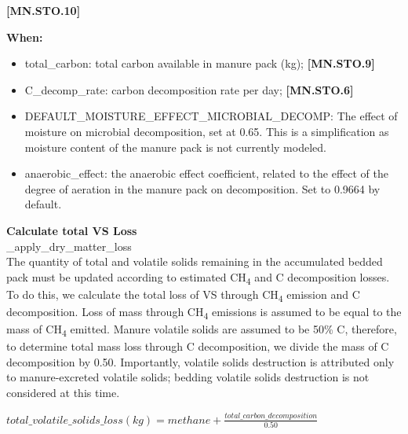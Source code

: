 \begin{refsection}
\begin{itemize}
            {\raggedleft \textbf{[MN.STO.10]}\par}
            \vspace{0.5cm}

        \textbf{When:}

        \begin{itemize}
            \item total\_carbon: total carbon available in manure pack (kg); \textbf{[MN.STO.9]}
            \item C\_decomp\_rate: carbon decomposition rate per day; \textbf{[MN.STO.6]}
            \item DEFAULT\_MOISTURE\_EFFECT\_MICROBIAL\_DECOMP: The effect of moisture on microbial decomposition, set at 0.65. This is a simplification as moisture content of the manure pack is not currently modeled. 
            \item anaerobic\_effect: the anaerobic effect coefficient, related to the effect of the degree of aeration in the manure pack on decomposition. Set to 0.9664 by default.
        \end{itemize}
        \vspace{0.5cm} 
       
    \end{itemize}



    \textbf{Calculate total VS Loss}\\ 
    \_apply\_dry\_matter\_loss\\
    The quantity of total and volatile solids remaining in the accumulated bedded pack must be updated according to estimated CH\textsubscript{4} and C decomposition losses. To do this, we calculate the total loss of VS through CH\textsubscript{4} emission and C decomposition. Loss of mass through CH\textsubscript{4} emissions is assumed to be equal to the mass of CH\textsubscript{4} emitted. Manure volatile solids are assumed to be 50\% C, therefore, to determine total mass loss through C decomposition, we divide the mass of C decomposition by 0.50. Importantly, volatile solids destruction is attributed only to manure-excreted volatile solids; bedding volatile solids destruction is not considered at this time.
        \vspace{0.5cm}        
    
    \begin{center}
        \(total\_volatile\_solids\_loss (kg) = methane + \frac{total\_carbon\_decomposition}{0.50}\)
    \end{center}
        \vspace{0.5cm} 
    

\end{refsection}
